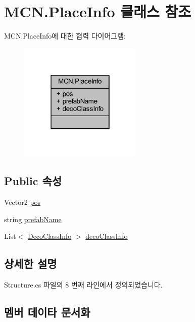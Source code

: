 \hypertarget{class_m_c_n_1_1_place_info}{}\section{M\+C\+N.\+Place\+Info 클래스 참조}
\label{class_m_c_n_1_1_place_info}


M\+C\+N.\+Place\+Info에 대한 협력 다이어그램\+:
\nopagebreak
\begin{figure}[H]
\begin{center}
\leavevmode
\includegraphics[width=166pt]{class_m_c_n_1_1_place_info__coll__graph}
\end{center}
\end{figure}
\subsection*{Public 속성}
\begin{DoxyCompactItemize}
\item 
Vector2 \hyperlink{class_m_c_n_1_1_place_info_ab61c1f49a0d342fb132a2af87ee7c322}{pos}
\item 
string \hyperlink{class_m_c_n_1_1_place_info_aedf20cfad59c8298386c61bdcc266457}{prefab\+Name}
\item 
List$<$ \hyperlink{class_m_c_n_1_1_deco_class_info}{Deco\+Class\+Info} $>$ \hyperlink{class_m_c_n_1_1_place_info_a52b0fe979b2c0403be64f1f42262e086}{deco\+Class\+Info}
\end{DoxyCompactItemize}


\subsection{상세한 설명}


Structure.\+cs 파일의 8 번째 라인에서 정의되었습니다.



\subsection{멤버 데이타 문서화}

